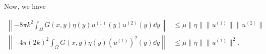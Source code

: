 \documentclass[a4paper, 12pt]{article}
\begin{document}
Now, we have
\iffalse
\begin{align*}
	\lVert K_1 \rVert &\le \mu\lVert \eta \rVert \lVert u^{(1)} u^{(2)} \rVert\le \mu\lVert \eta \rVert\lVert u^{(1)} \rVert\lVert u^{(2)} \rVert\\
	\lVert K_2 \rVert &\le \mu\lVert \eta \rVert \lVert u^{(1)}^2 \rVert \le \mu \lVert \eta \rVert\lVert u^{(1)} \rVert^2
.\end{align*}
\fi
\begin{align*}
	\left\lVert-8\pi k^2 \int_{\Omega}^{} G\left( x,y \right) \eta\left( y \right) u^{(1)}\left( y \right) u^{(2)}\left( y \right)\dd{y} \right\rVert
	&\le \mu\lVert \eta \rVert\lVert u^{(1)} \rVert\lVert u^{(2)} \rVert\\
	\left\lVert-4\pi \left( 2k \right)^2 \int_{\Omega}^{} G\left( x,y \right) \eta\left( y \right) \left(u^{(1)}\right)^2\left( y \right)\dd{y} \right\rVert
	&\le \mu \lVert \eta \rVert\lVert u^{(1)} \rVert^2
.\end{align*}
\end{document}
